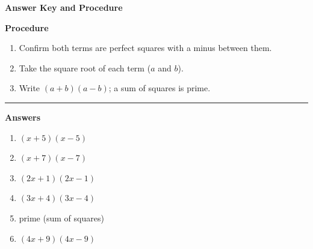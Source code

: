 \documentclass[12pt]{article}
\begin{document}
\begin{center}{\Large \textbf{Answer Key and Procedure}}\end{center}
\vspace{0.3cm}
\textbf{Procedure}
\begin{enumerate}
  \item Confirm both terms are perfect squares with a minus between them.
  \item Take the square root of each term ($a$ and $b$).
  \item Write $(a+b)(a-b)$; a sum of squares is prime.
\end{enumerate}
\vspace{0.4cm}\hrule\vspace{0.4cm}
\textbf{Answers}
\begin{enumerate}[label=\textbf{\arabic*.}]
  \item $(x+5)(x-5)$
  \item $(x+7)(x-7)$
  \item $(2x+1)(2x-1)$
  \item $(3x+4)(3x-4)$
  \item prime (sum of squares)
  \item $(4x+9)(4x-9)$
\end{enumerate}
\end{document}
